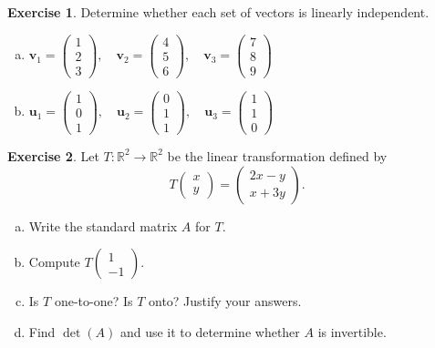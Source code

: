 \documentclass[11pt]{article}
\theoremstyle{definition}
\newtheorem{exercise}{Exercise}
\begin{document}
\begin{exercise}
Determine whether each set of vectors is linearly independent.
\begin{enumerate}[(a)]
  \item $\mathbf{v}_1 = \begin{pmatrix} 1 \\ 2 \\ 3 \end{pmatrix}, \quad
         \mathbf{v}_2 = \begin{pmatrix} 4 \\ 5 \\ 6 \end{pmatrix}, \quad
         \mathbf{v}_3 = \begin{pmatrix} 7 \\ 8 \\ 9 \end{pmatrix}$

  \item $\mathbf{u}_1 = \begin{pmatrix} 1 \\ 0 \\ 1 \end{pmatrix}, \quad
         \mathbf{u}_2 = \begin{pmatrix} 0 \\ 1 \\ 1 \end{pmatrix}, \quad
         \mathbf{u}_3 = \begin{pmatrix} 1 \\ 1 \\ 0 \end{pmatrix}$
\end{enumerate}
\end{exercise}

\begin{exercise}
Let $T \colon \mathbb{R}^2 \to \mathbb{R}^2$ be the linear transformation defined by
\[
  T\begin{pmatrix} x \\ y \end{pmatrix} = \begin{pmatrix} 2x - y \\ x + 3y \end{pmatrix}.
\]
\begin{enumerate}[(a)]
  \item Write the standard matrix $A$ for $T$.
  \item Compute $T\begin{pmatrix} 1 \\ -1 \end{pmatrix}$.
  \item Is $T$ one-to-one? Is $T$ onto? Justify your answers.
  \item Find $\det(A)$ and use it to determine whether $A$ is invertible.
\end{enumerate}
\end{exercise}
\end{document}
